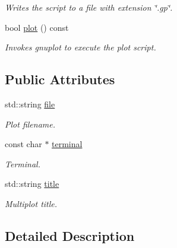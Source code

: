 \begin{DoxyCompactItemize}
\begin{DoxyCompactList}\small\item\em Writes the script to a file with extension \char`\"{}.\+gp\char`\"{}. \end{DoxyCompactList}\item 
\hypertarget{a00380_ad0bb261f48733d7db941f70e5580d3c2}{}bool \hyperlink{a00380_ad0bb261f48733d7db941f70e5580d3c2}{plot} () const \label{a00380_ad0bb261f48733d7db941f70e5580d3c2}

\begin{DoxyCompactList}\small\item\em Invokes gnuplot to execute the plot script. \end{DoxyCompactList}\end{DoxyCompactItemize}
\subsection*{Public Attributes}
\begin{DoxyCompactItemize}
\item 
\hypertarget{a00380_aa8ca7763d97797780ac1d22c43242619}{}std\+::string \hyperlink{a00380_aa8ca7763d97797780ac1d22c43242619}{file}\label{a00380_aa8ca7763d97797780ac1d22c43242619}

\begin{DoxyCompactList}\small\item\em Plot filename. \end{DoxyCompactList}\item 
\hypertarget{a00380_a20b5d0ee587a7b330a1a902bec367bd4}{}const char $\ast$ \hyperlink{a00380_a20b5d0ee587a7b330a1a902bec367bd4}{terminal}\label{a00380_a20b5d0ee587a7b330a1a902bec367bd4}

\begin{DoxyCompactList}\small\item\em Terminal. \end{DoxyCompactList}\item 
\hypertarget{a00380_ab14fca27427ba44595cc20ce994938fe}{}std\+::string \hyperlink{a00380_ab14fca27427ba44595cc20ce994938fe}{title}\label{a00380_ab14fca27427ba44595cc20ce994938fe}

\begin{DoxyCompactList}\small\item\em Multiplot title. \end{DoxyCompactList}\end{DoxyCompactItemize}


\subsection{Detailed Description}
